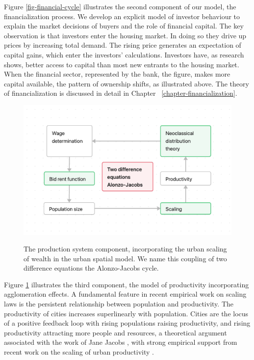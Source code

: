 Figure \ref{fig-financial-cycle} illustrates the second component of our model, the financialization process. We develop an explicit model of investor behaviour to explain the market decisions of buyers and the role of financial capital. 
The key observation is that investors enter the housing market. In doing so they drive up prices by increasing total demand. The rising price generates an expectation of capital gains, which enter the investors' calculations. Investors have, as research shows, better access to capital than most new entrants to the housing market. When the financial sector, represented by the bank, the figure, %
makes more capital available, the pattern of ownership shifts, as illustrated above. The theory of financialization is discussed in detail in Chapter ~\ref{chapter-financialization}.

\begin{figure}[!ht]
    \centering
    \includegraphics[scale=.7]{fig/flow_Alonzo-Jacobs_cycle.png}
    \label{fig-Alonzo-Jacobs-cycle}
\caption{The production system component, incorporating the urban scaling of wealth in the urban spatial model. We name this coupling of two difference equations the Alonzo-Jacobs cycle.}
\end{figure}

Figure \ref{fig-Alonzo-Jacobs-cycle} illustrates the third component, the model of productivity incorporating agglomeration effects. %
A fundamental feature in recent empirical work on scaling laws is %
the persistent relationship between population and productivity. The productivity of cities increases superlinearly with population. Cities are the locus of a positive feedback loop with rising populations raising productivity, and rising productivity attracting more people and resources, a theoretical argument associated with the work of Jane Jacobs \cite{jacobsEconomyCities1969}, with strong empirical support from recent work on the scaling of urban productivity  \cite{bettencourtGrowthInnovationScaling2007, bettencourtOriginsScalingCities2013, dongUnderstandingMesoscopicScaling2020, loboUrbanScalingProduction2013}.

